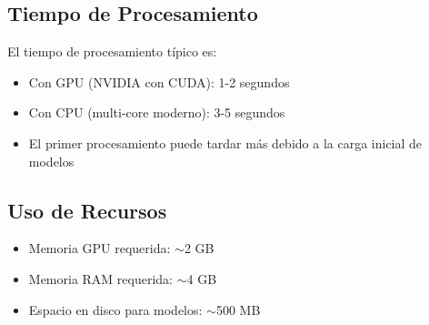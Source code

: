\subsection{Tiempo de Procesamiento}

El tiempo de procesamiento típico es:
\begin{itemize}
    \item Con GPU (NVIDIA con CUDA): 1-2 segundos
    \item Con CPU (multi-core moderno): 3-5 segundos
    \item El primer procesamiento puede tardar más debido a la carga inicial de modelos
\end{itemize}

\subsection{Uso de Recursos}

\begin{itemize}
    \item Memoria GPU requerida: $\sim$2 GB
    \item Memoria RAM requerida: $\sim$4 GB
    \item Espacio en disco para modelos: $\sim$500 MB
\end{itemize}
